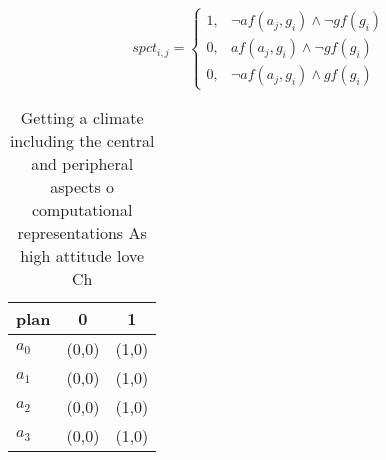 \documentclass[a4paper]{article}
\begin{document}
\begin{equation}
spct_{i,j} =
\begin{cases}
1, & \text{$\neg af(a_j,g_i) \wedge \neg gf(g_i)$}\\
0, & \text{$af(a_j,g_i) \wedge \neg gf(g_i)$}\\
0, & \text{$\neg af(a_j,g_i) \wedge gf(g_i)$}
\end{cases}
\end{equation}

\begin{table}
\begin{adjustbox}{width=0.9\columnwidth}
\begin{tabular}{|l|l|l|}
\hline
\textbf{plan} & \multicolumn{1}{c|}{\textbf{0}} & \multicolumn{1}{c|}{\textbf{1}} \\ \hline
\textbf{$a_0$}  & (0,0) & (1,0) \\ \hline
\textbf{$a_1$}  & (0,0) & (1,0) \\ \hline
\textbf{$a_2$}  & (0,0) & (1,0) \\ \hline
\textbf{$a_3$}  & (0,0) & (1,0) \\ \hline
\end{tabular}
\end{adjustbox}
\caption{Getting a climate including the central and peripheral aspects o computational representations As high attitude love Ch
}
\end{table}
\end{document}
